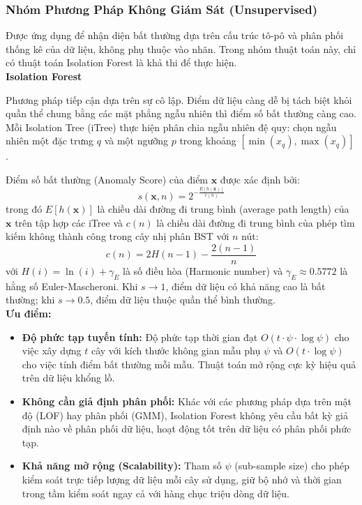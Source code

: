 \subsubsection{Nhóm Phương Pháp Không Giám Sát (Unsupervised) }
Được ứng dụng để nhận diện bất thường dựa trên cấu trúc tô-pô và phân phối thống kê của dữ liệu, không phụ thuộc vào nhãn. Trong nhóm thuật toán này, chỉ có thuật toán Isolation Forest là khả thi để thực hiện.\\

\textbf{Isolation Forest}

Phương pháp tiếp cận dựa trên sự cô lập. Điểm dữ liệu càng dễ bị tách biệt khỏi quần thể chung bằng các mặt phẳng ngẫu nhiên thì điểm số bất thường càng cao. Mỗi Isolation Tree (iTree) thực hiện phân chia ngẫu nhiên đệ quy: chọn ngẫu nhiên một đặc trưng $q$ và một ngưỡng $p$ trong khoảng $[\min(x_q), \max(x_q)]$.

Điểm số bất thường (Anomaly Score) của điểm $\mathbf{x}$ được xác định bởi:
\begin{equation*}
    s(\mathbf{x}, n) = 2^{-\frac{E[h(\mathbf{x})]}{c(n)}}
\end{equation*}
trong đó $E[h(\mathbf{x})]$ là chiều dài đường đi trung bình (average path length) của $\mathbf{x}$ trên tập hợp các iTree và $c(n)$ là chiều dài đường đi trung bình của phép tìm kiếm không thành công trong cây nhị phân BST với $n$ nút:
\begin{equation*}
    c(n) = 2H(n-1) - \frac{2(n-1)}{n}
\end{equation*}
với $H(i) = \ln(i) + \gamma_E$ là số điều hòa (Harmonic number) và $\gamma_E \approx 0.5772$ là hằng số Euler-Mascheroni. Khi $s \to 1$, điểm dữ liệu có khả năng cao là bất thường; khi $s \to 0.5$, điểm dữ liệu thuộc quần thể bình thường.\\

\textbf{Ưu điểm:}
\begin{itemize}
    \item \textbf{Độ phức tạp tuyến tính:} Độ phức tạp thời gian đạt $O(t \cdot \psi \cdot \log \psi)$ cho việc xây dựng $t$ cây với kích thước không gian mẫu phụ $\psi$ và $O(t \cdot \log \psi)$ cho việc tính điểm bất thường mỗi mẫu. Thuật toán mở rộng cực kỳ hiệu quả trên dữ liệu khổng lồ.
    \item \textbf{Không cần giả định phân phối:} Khác với các phương pháp dựa trên mật độ (LOF) hay phân phối (GMM), Isolation Forest không yêu cầu bất kỳ giả định nào về phân phối dữ liệu, hoạt động tốt trên dữ liệu có phân phối phức tạp.
    \item \textbf{Khả năng mở rộng (Scalability):} Tham số $\psi$ (sub-sample size) cho phép kiểm soát trực tiếp lượng dữ liệu mỗi cây sử dụng, giữ bộ nhớ và thời gian trong tầm kiểm soát ngay cả với hàng chục triệu dòng dữ liệu.
\end{itemize}

